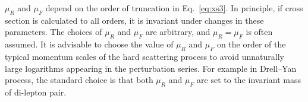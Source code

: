 $\mu_{R}$ and $\mu_{F}$ depend on the order of truncation in Eq.~\ref{eq:xs3}.
In principle, if cross section is calculated to all orders, it is invariant under changes in these parameters.
The choices of $\mu_{R}$ and $\mu_{F}$ are arbitrary, and $\mu_{R} = \mu_{F}$ is often assumed. 
It is advisable to choose the value of $\mu_{R}$ and $\mu_{F}$ on the order of the typical momentum scales of
the hard scattering process to avoid unnaturally large logarithms appearing in the perturbation series.
For example in Drell–Yan process, the standard choice is that both $\mu_{R}$ and $\mu_{F}$ are set to the invariant mass of di-lepton pair.
